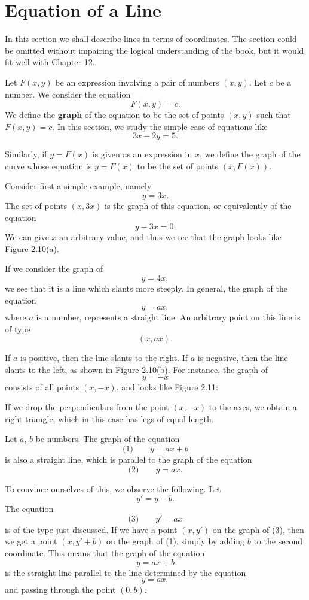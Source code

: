 \documentclass[12pt]{book} %
\begin{document}
\section{Equation of a Line}

In this section we shall describe lines in terms of coordinates. The section could be omitted without impairing the logical understanding of the book, but it would fit well with Chapter 12.

Let $F(x,y)$ be an expression involving a pair of numbers $(x,y)$. Let $c$ be a number. We consider the equation
\[
F(x,y)=c.
\]
We define the \textbf{graph} of the equation to be the set of points $(x,y)$ such that $F(x,y)=c$. In this section, we study the simple case of equations like
\[
3x-2y=5.
\]

Similarly, if $y=F(x)$ is given as an expression in $x$, we define the graph of the curve whose equation is $y=F(x)$ to be the set of points $(x,F(x))$.

Consider first a simple example, namely
\[
y=3x.
\]
The set of points $(x,3x)$ is the graph of this equation, or equivalently of the equation
\[
y-3x=0.
\]
We can give $x$ an arbitrary value, and thus we see that the graph looks like Figure 2.10(a).


If we consider the graph of
\[
y=4x,
\]
we see that it is a line which slants more steeply. In general, the graph of the equation
\[
y=ax,
\]
where $a$ is a number, represents a straight line. An arbitrary point on this line is of type
\[
(x,ax).
\]

If $a$ is positive, then the line slants to the right. If $a$ is negative, then the line slants to the left, as shown in Figure 2.10(b). For instance, the graph of
\[
y=-x
\]
consists of all points $(x,-x)$, and looks like Figure 2.11:


If we drop the perpendiculars from the point $(x,-x)$ to the axes, we obtain a right triangle, which in this case has legs of equal length.

Let $a$, $b$ be numbers. The graph of the equation
\[
\text{(1)}\qquad y=ax+b
\]
is also a straight line, which is parallel to the graph of the equation
\[
\text{(2)}\qquad y=ax.
\]

To convince ourselves of this, we observe the following. Let
\[
y'=y-b.
\]
The equation
\[
\text{(3)}\qquad y'=ax
\]
is of the type just discussed. If we have a point $(x,y')$ on the graph of (3), then we get a point $(x,y'+b)$ on the graph of (1), simply by adding $b$ to the second coordinate. This means that the graph of the equation
\[
y=ax+b
\]
is the straight line parallel to the line determined by the equation
\[
y=ax,
\]
and passing through the point $(0,b)$.
\end{document}

